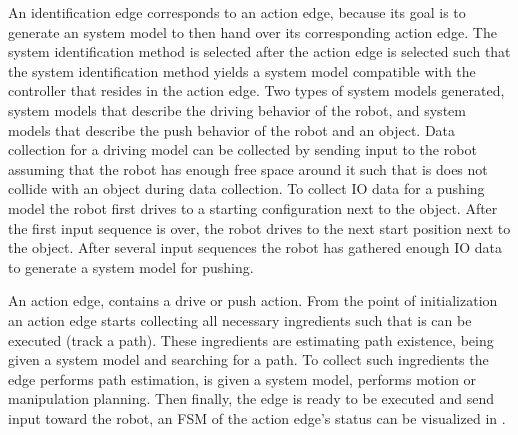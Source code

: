 An identification edge corresponds to an action edge, because its goal is to generate an system model to then hand over its corresponding action edge. The system identification method is selected after the action edge is selected such that the system identification method yields a system model compatible with the controller that resides in the action edge. Two types of system models generated, system models that describe the driving behavior of the robot, and system models that describe the push behavior of the robot and an object. Data collection for a driving model can be collected by sending input to the robot assuming that the robot has enough free space around it such that is does not collide with an object during data collection. To collect \ac{IO} data for a pushing model the robot first drives to a starting configuration next to the object. After the first input sequence is over, the robot drives to the next start position next to the object. After several input sequences the robot has gathered enough \ac{IO} data to generate a system model for pushing.\bs

An action edge, contains a drive or push action. From the point of initialization an action edge starts collecting all necessary ingredients such that is can be executed (track a path). These ingredients are estimating path existence, being given a system model and searching for a path. To collect such ingredients the edge performs path estimation, is given a system model, performs motion or manipulation planning. Then finally, the edge is ready to be executed and send input toward the robot, an \ac{FSM} of the action edge's status can be visualized in .\bs
{}

